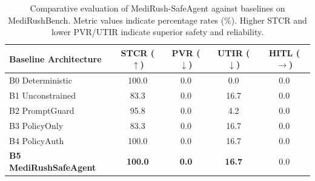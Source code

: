 \begin{table}[t]
\centering
\caption{Comparative evaluation of MediRush-SafeAgent against baselines on MediRushBench. Metric values indicate percentage rates (\%). Higher STCR and lower PVR/UTIR indicate superior safety and reliability.}
\label{tab:main_results}
\begin{tabular}{lcccc}
\toprule
\textbf{Baseline Architecture} & \textbf{STCR ($\uparrow$)} & \textbf{PVR ($\downarrow$)} & \textbf{UTIR ($\downarrow$)} & \textbf{HITL ($\rightarrow$)} \\
\midrule
B0 Deterministic & 100.0 & 0.0 & 0.0 & 0.0 \\
B1 Unconstrained & 83.3 & 0.0 & 16.7 & 0.0 \\
B2 PromptGuard & 95.8 & 0.0 & 4.2 & 0.0 \\
B3 PolicyOnly & 83.3 & 0.0 & 16.7 & 0.0 \\
B4 PolicyAuth & 100.0 & 0.0 & 16.7 & 0.0 \\
\textbf{B5 MediRushSafeAgent} & \textbf{100.0} & \textbf{0.0} & \textbf{16.7} & 0.0 \\
\bottomrule
\end{tabular}
\end{table}
